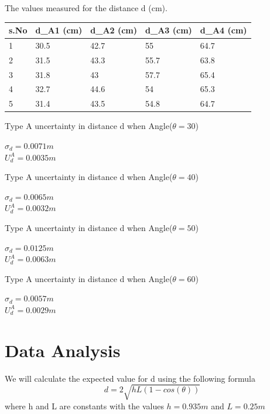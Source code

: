 The values measured for the distance d (cm).
\begin{center}
\begin{tabular}{|l|l|l|l|l|}
\hline
\textbf{s.No} & \textbf{d\_A1 (cm)} & \textbf{d\_A2 (cm)} & \textbf{d\_A3 (cm)} & \textbf{d\_A4 (cm)} \\ \hline
1             & 30.5                & 42.7                & 55                  & 64.7                \\ \hline
2             & 31.5                & 43.3                & 55.7                & 63.8                \\ \hline
3             & 31.8                & 43                  & 57.7                & 65.4                \\ \hline
4             & 32.7                & 44.6                & 54                  & 65.3                \\ \hline
5             & 31.4                & 43.5                & 54.8                & 64.7                \\ \hline
\end{tabular}
\end{center}
Type A uncertainty in distance d when Angle($\theta = 30$)
\begin{center}
$\sigma_d = 0.0071m$ \\
$ U_d^A =  0.0035m$ \\
\end{center}
Type A uncertainty in distance d when Angle($\theta = 40$)
\begin{center}
$\sigma_d = 0.0065m$ \\
$ U_d^A =  0.0032m$ \\
\end{center}
Type A uncertainty in distance d when Angle($\theta = 50$)
\begin{center}
$\sigma_d = 0.0125m$ \\
$ U_d^A =  0.0063m$ \\
\end{center}
Type A uncertainty in distance d when Angle($\theta = 60$)
\begin{center}
$\sigma_d = 0.0057m$ \\
$ U_d^A =  0.0029m$ \\
\end{center}



\section{Data Analysis}
We will calculate the expected value for d using the following formula
    $$ d = 2 \sqrt{hL(1-cos(\theta))}$$
where h and L are constants with the values $ h = 0.935m$ and $L = 0.25m$\\

